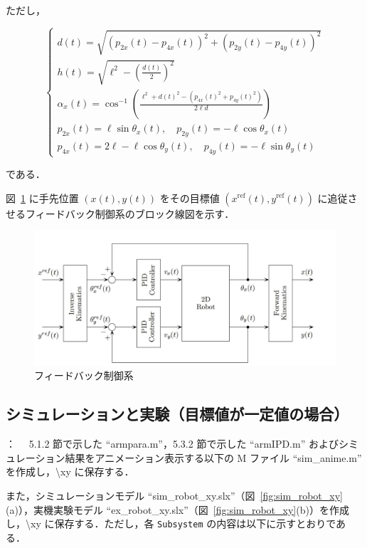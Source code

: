 ただし，

\begin{equation}
\begin{cases}
d(t) = \sqrt{(p_{2x}(t) - p_{4x}(t))^2 + (p_{2y}(t) - p_{4y}(t))^2} \\
h(t) = \sqrt{\ell^2 - \left( \frac{d(t)}{2} \right)^2} \\
\alpha_x(t) = \cos^{-1} \left( \frac{\ell^2 + d(t)^2 - (p_{4x}(t)^2 + p_{4y}(t)^2)}{2\ell d} \right) \\
p_{2x}(t) = \ell \sin \theta_x(t),\quad p_{2y}(t) = -\ell \cos \theta_x(t) \\
p_{4x}(t) = 2\ell - \ell \cos \theta_y(t),\quad p_{4y}(t) = -\ell \sin \theta_y(t)
\end{cases}
\end{equation}

である．

図~\ref{fig:block_diagram} に手先位置 $(x(t), y(t))$ をその目標値 $(x^{\mathrm{ref}}(t), y^{\mathrm{ref}}(t))$ に追従させるフィードバック制御系のブロック線図を示す．

\begin{figure}[H]
  \centering
  \includegraphics[width=0.85\linewidth]{figure/block6_1.pdf}
  \caption{フィードバック制御系}
  \label{fig:block_diagram}
\end{figure}

\subsection{シミュレーションと実験（目標値が一定値の場合）}

：　
5.1.2 節で示した ``armpara.m''，5.3.2 節で示した ``armIPD.m'' およびシミュレーション結果をアニメーション表示する以下の M ファイル ``sim\_anime.m'' を作成し，\textbackslash xy に保存する．

また，シミュレーションモデル ``sim\_robot\_xy.slx''（図~\ref{fig:sim_robot_xy}(a)），実機実験モデル ``ex\_robot\_xy.slx''（図~\ref{fig:sim_robot_xy}(b)）を作成し，\textbackslash xy に保存する．ただし，各 \texttt{Subsystem} の内容は以下に示すとおりである．

